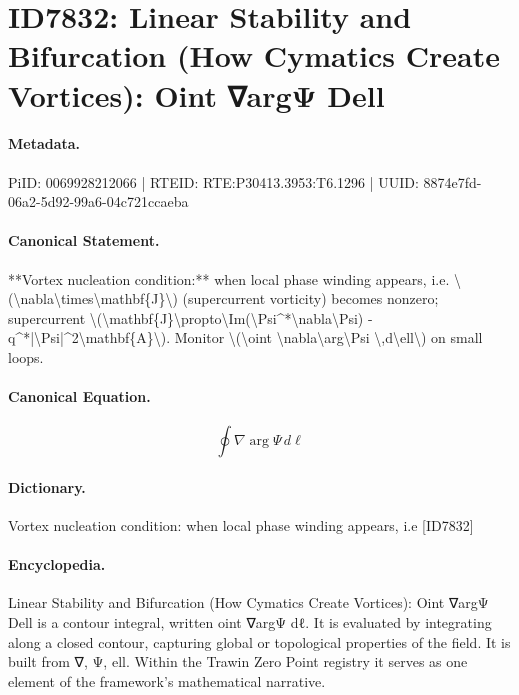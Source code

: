 \section*{ID7832: Linear Stability and Bifurcation (How Cymatics Create Vortices): Oint ∇argΨ Dell}
\paragraph{Metadata.}
PiID: 0069928212066 | RTEID: RTE:P30413.3953:T6.1296 | UUID: 8874e7fd-06a2-5d92-99a6-04c721ccaeba

\paragraph{Canonical Statement.}
**Vortex nucleation condition:** when local phase winding appears, i.e. \textbackslash{}(\textbackslash{}nabla\textbackslash{}times\textbackslash{}mathbf\{J\}\textbackslash{}) (supercurrent vorticity) becomes nonzero; supercurrent \textbackslash{}(\textbackslash{}mathbf\{J\}\textbackslash{}propto\textbackslash{}Im(\textbackslash{}Psi\textasciicircum{}*\textbackslash{}nabla\textbackslash{}Psi) - q\textasciicircum{}*|\textbackslash{}Psi|\textasciicircum{}2\textbackslash{}mathbf\{A\}\textbackslash{}). Monitor \textbackslash{}(\textbackslash{}oint \textbackslash{}nabla\textbackslash{}arg\textbackslash{}Psi \textbackslash{},d\textbackslash{}ell\textbackslash{}) on small loops.

\paragraph{Canonical Equation.}
\[
\oint \nabla\arg\Psi \,d\ell
\]

\paragraph{Dictionary.}
Vortex nucleation condition: when local phase winding appears, i.e [ID7832]

\paragraph{Encyclopedia.}
Linear Stability and Bifurcation (How Cymatics Create Vortices): Oint ∇argΨ Dell is a contour integral, written oint ∇argΨ dℓ. It is evaluated by integrating along a closed contour, capturing global or topological properties of the field. It is built from ∇, Ψ, ell. Within the Trawin Zero Point registry it serves as one element of the framework's mathematical narrative.
